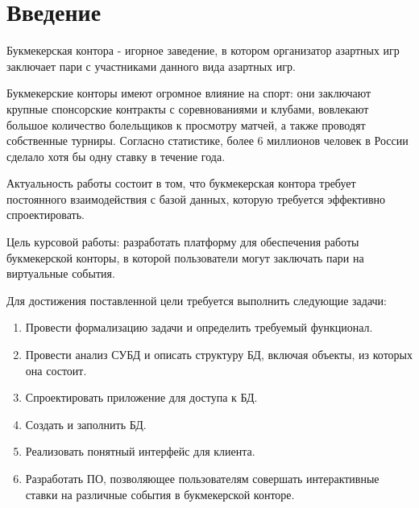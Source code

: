 \chapter*{Введение}
Букмекерская контора - игорное заведение, в котором организатор азартных игр заключает пари с участниками данного вида азартных игр. 

Букмекерские конторы имеют огромное влияние на спорт: они заключают крупные спонсорские контракты с соревнованиями и клубами, вовлекают большое количество болельщиков к просмотру матчей, а также проводят собственные турниры. Согласно статистике, более 6 миллионов человек в России сделало хотя бы одну ставку в течение года.

Актуальность работы состоит в том, что букмекерская контора требует постоянного взаимодействия с базой данных, которую требуется эффективно спроектировать.

Цель курсовой работы: разработать платформу для обеспечения работы букмекерской конторы, в которой пользователи могут заключать пари на виртуальные события.

Для достижения поставленной цели требуется выполнить следующие задачи:
\begin{enumerate}
	\item Провести формализацию задачи и определить требуемый функционал.
	\item Провести анализ СУБД и описать структуру БД, включая объекты, из которых она состоит.
	\item Спроектировать приложение для доступа к БД.
	\item Создать и заполнить БД.
	\item Реализовать понятный интерфейс для клиента.
	\item Разработать ПО, позволяющее пользователям совершать интерактивные ставки на различные события в букмекерской конторе.
\end{enumerate} 
